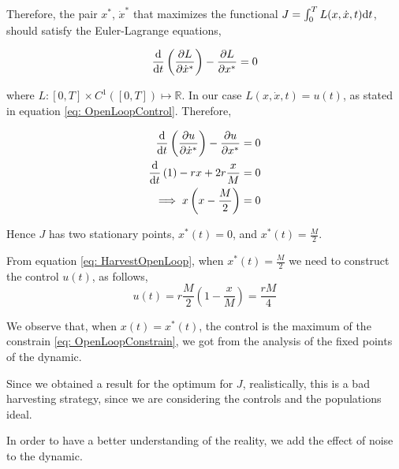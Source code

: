 Therefore, the pair $x^*$, $\dot{x}^*$ that maximizes the functional $J=\int_0^T L(x, \dot{x}, t)\mathrm{d} t$, should satisfy the Euler-Lagrange equations,

\begin{equation}
	\frac{\mathrm{d} }{{\mathrm{d} t}}\left(\frac{\partial L}{{\partial \dot{x}^*}}\right)-\frac{\partial L}{{\partial x^*}}=0
\end{equation}

where $L:[0,T]\times C^1([0,T]) \mapsto \mathbb{R}$. In our case $L(x,\dot{x}, t)=u(t)$, as stated in equation \ref{eq: OpenLoopControl}. Therefore,

\begin{align}
	\frac{\mathrm{d} }{{\mathrm{d} t}}\left(\frac{\partial u}{{\partial \dot{x}^*}}\right)-\frac{\partial u}{{\partial x^*}}&=0 \nonumber\\ \frac{\mathrm{d} }{{\mathrm{d} t}}\left(1\right)-rx+2r\frac{x}{M}&=0 \nonumber\\
	\implies x\left(x- \frac{M}{2}\right)&=0
\end{align}

Hence $J$ has two stationary points, $x^*(t)=0$, and $x^*(t)=\frac{M}{2}$.

From equation \ref{eq: HarvestOpenLoop}, when $x^*(t)=\frac{M}{2}$ we need to construct the control $u(t)$, as follows,
\begin{equation}
	u(t)=r\frac{M}{2}\left(1-\frac{x}{M}\right)=\frac{rM}{4}
\end{equation}

We observe that, when $x(t)=x^*(t)$, the control is the maximum of the constrain \ref{eq: OpenLoopConstrain}, we got from the analysis of the fixed points of the dynamic.


Since we obtained a result for the optimum for $J$, realistically, this is a bad harvesting strategy, since we are considering the controls and the populations ideal.

In order to have a better understanding of the reality, we add the effect of noise to the dynamic.

